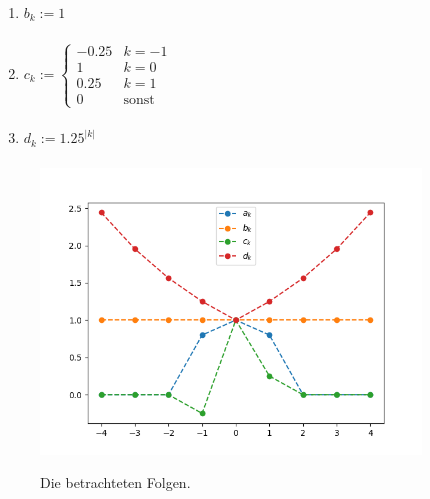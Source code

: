 \documentclass[a4paper,11pt,notitlepage,fullpage]{article}
\begin{document}
\begin{enumerate}
\begin{enumerate}
\item $b_k := 1$
\begin{align*}
\end{align*}

\item $c_k := \begin{cases}
-0.25 & k = -1 \\
1 & k = 0 \\
0.25 & k = 1 \\
0 & \text{sonst}
\end{cases}$
\begin{align*}
\end{align*}

\item $d_k := 1.25^{|k|}$
\begin{align*}
\end{align*}
\end{enumerate}

\begin{figure}[h!]
\centering
\includegraphics[width=0.9\textwidth]{gfx/34_fig.png}
\label{fig2}
\caption{Die betrachteten Folgen.}
\end{figure}


\end{enumerate}
\end{document}
